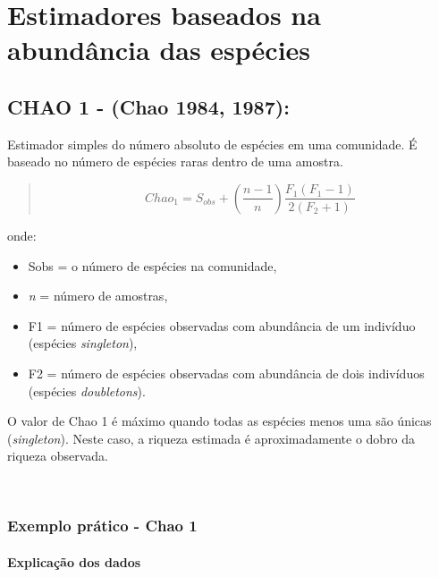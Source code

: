 \documentclass[
]{book}
\begin{document}
\hypertarget{estimadores-baseados-na-abunduxe2ncia-das-espuxe9cies}{%
\section{Estimadores baseados na abundância das espécies}\label{estimadores-baseados-na-abunduxe2ncia-das-espuxe9cies}}

\hypertarget{chao-1---chao-1984-1987}{%
\subsection{CHAO 1 - (Chao 1984, 1987):}\label{chao-1---chao-1984-1987}}

Estimador simples do número absoluto de espécies em uma comunidade. É baseado no número de espécies raras dentro de uma amostra.

\begin{quote}
\[Chao_{1} = S_{obs} + \left(\frac{n-1}{n}\right)\frac{F_1(F_1-1)}{2(F_2+1)}\]
\end{quote}

onde:

\begin{itemize}
\item
  Sobs = o número de espécies na comunidade,
\item
  \emph{n} = número de amostras,
\item
  F1 = número de espécies observadas com abundância de um indivíduo (espécies \emph{singleton}),
\item
  F2 = número de espécies observadas com abundância de dois indivíduos (espécies \emph{doubletons}).
\end{itemize}

O valor de Chao 1 é máximo quando todas as espécies menos uma são únicas (\emph{singleton}). Neste caso, a riqueza estimada é aproximadamente o dobro da riqueza observada.

~

\hypertarget{exemplo-pruxe1tico---chao-1}{%
\subsubsection{Exemplo prático - Chao 1}\label{exemplo-pruxe1tico---chao-1}}

\hypertarget{explicauxe7uxe3o-dos-dados}{%
\paragraph{Explicação dos dados}\label{explicauxe7uxe3o-dos-dados}}
\end{document}
